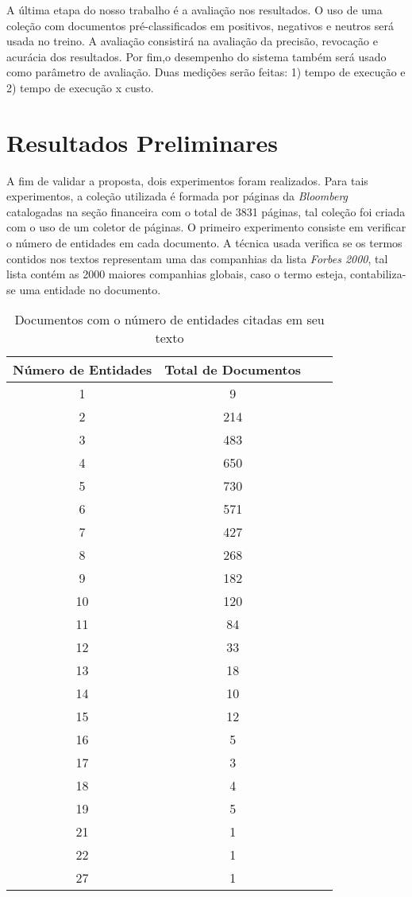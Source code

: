 \documentclass[a4paper,12pt]{article}
\begin{document}
A última etapa do nosso trabalho é a avaliação nos resultados. O uso de uma coleção com documentos pré-classificados em positivos, negativos e neutros será usada no treino. A avaliação consistirá na avaliação da precisão, revocação e acurácia dos resultados. Por fim,o desempenho do sistema também será usado como parâmetro de avaliação. Duas medições serão feitas: 1) tempo de execução e 2) tempo de execução x custo.

\section{Resultados Preliminares}

A fim de validar a proposta, dois experimentos foram realizados. Para tais experimentos, a coleção utilizada é formada por páginas da \textit{Bloomberg} catalogadas na seção financeira com o total de 3831 páginas, tal coleção foi criada com o uso de um coletor de páginas. O primeiro experimento consiste em verificar o número de entidades em cada documento. A técnica usada verifica se os termos contidos nos textos representam uma das companhias da lista \textit{Forbes 2000}, tal lista contém as 2000 maiores companhias globais, caso o termo esteja, contabiliza-se uma entidade no documento. 

\begin{table}
\begin{center}
    \begin{tabular}{ | c | c | c | p{8cm} |}
    \hline
    Número de Entidades & Total de Documentos \\ \hline
    1 & 9 \\ \hline
    2 & 214 \\ \hline
    3 & 483 \\ \hline
    4 & 650 \\ \hline
    5 & 730 \\ \hline
    6 & 571 \\ \hline
    7 & 427 \\ \hline
    8 & 268 \\ \hline
    9 & 182 \\ \hline
    10 & 120 \\ \hline
    11 & 84 \\ \hline
    12 & 33 \\ \hline
    13 & 18 \\ \hline
    14 & 10 \\ \hline
    15 & 12 \\ \hline
    16 & 5 \\ \hline
    17 & 3 \\ \hline
    18 & 4 \\ \hline
    19 & 5 \\ \hline
    21 & 1 \\ \hline
    22 & 1 \\ \hline
    27 & 1 \\
    \hline
    \end{tabular}
  \caption{Documentos com o número de entidades citadas em seu texto}
\end{center}
\end{table}
\end{document}

